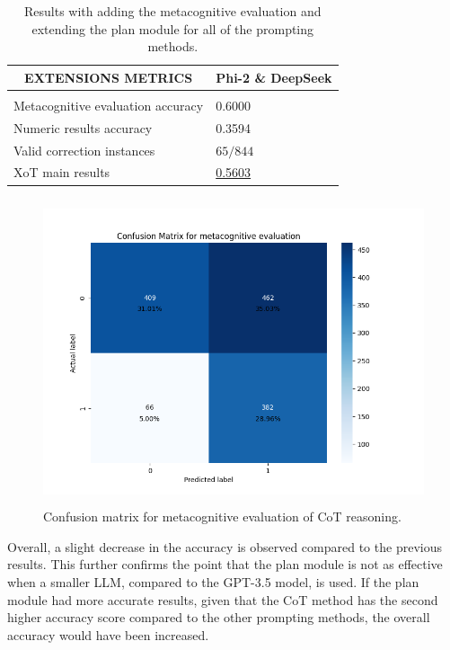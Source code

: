 \documentclass[10pt]{article} %
\begin{document}
\begin{table}[t]
  \caption{Results with adding the metacognitive evaluation and extending the plan module for all of the prompting methods.}
  \label{extension-results}
  \begin{center}
  \begin{tabular}{ll}
  \multicolumn{1}{c}{\bf EXTENSIONS METRICS}  &\multicolumn{1}{c}{\bf Phi-2 \& DeepSeek}
  \\ \hline \\
  Metacognitive evaluation accuracy        &0.6000\\
  Numeric results accuracy                 &0.3594\\
  Valid correction instances               &$65/844$\\
  XoT main results                         &\underline{0.5603}\\
  \end{tabular}
  \end{center}
  \end{table}

  \begin{figure}[h]
    \begin{center}
      \includegraphics[height=9cm]{graphs/cm_metacognitive.png}
      \end{center}
      \caption{Confusion matrix for metacognitive evaluation of CoT reasoning.}
      \label{fig:cm-metacognitive}
    \end{figure}

Overall, a slight decrease in the accuracy is observed compared to the previous results. This further confirms the point that the plan module is not as effective when a smaller LLM, compared to the GPT-3.5 model, is used. If the plan module had more accurate results, given that the CoT method has the second higher accuracy score compared to the other prompting methods, the overall accuracy would have been increased. 
\end{document}
